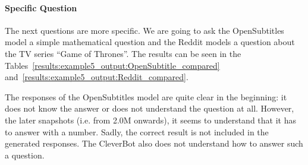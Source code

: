 \paragraph{Specific Question}
The next questions are more specific. We are going to ask the OpenSubtitles model a simple mathematical question and the Reddit models a question about the TV series ``Game of Thrones''. The results can be seen in the Tables~\ref{results:example5_output:OpenSubtitle_compared} and~\ref{results:example5_output:Reddit_compared}.

The responses of the OpenSubtitles model are quite clear in the beginning: it does not know the answer or does not understand the question at all. However, the later snapshots (i.e. from 2.0M onwards), it seems to understand that it has to answer with a number. Sadly, the correct result is not included in the generated responses. The CleverBot also does not understand how to answer such a question.


